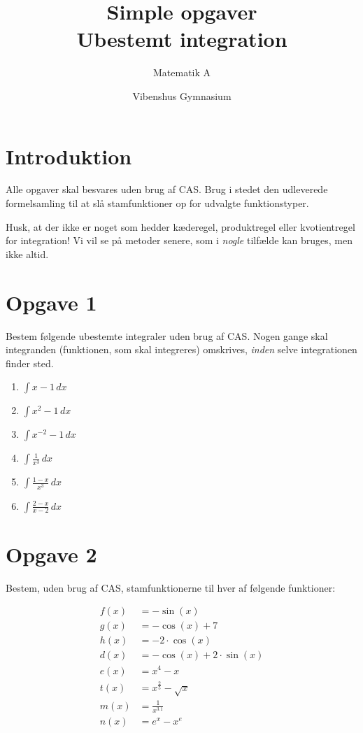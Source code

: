 \documentclass[a4paper, 12pt]{article}
\author{Matematik A}
\date{Vibenshus Gymnasium}
\title{Simple opgaver\\\medskip
\large Ubestemt integration}
\begin{document}
\maketitle

\section*{Introduktion}
\label{sec:org5ec3a09}

Alle opgaver skal besvares uden brug af CAS. Brug i stedet den udleverede formelsamling til at slå stamfunktioner op for udvalgte funktionstyper.

Husk, at der ikke er noget som hedder kæderegel, produktregel eller kvotientregel for integration! Vi vil se på metoder senere, som i \emph{nogle} tilfælde kan bruges, men ikke altid.

\section*{Opgave 1}
\label{sec:orgecebe7a}

Bestem følgende ubestemte integraler uden brug af CAS. Nogen gange skal integranden (funktionen, som skal integreres) omskrives, \emph{inden} selve integrationen finder sted.

\begin{enumerate}
\item \(\int x -1 \,dx\)
\item \(\int x^2 -1 \,dx\)
\item \(\int x^{-2} -1 \,dx\)
\item \(\int \frac{1}{x^3} \,dx\)
\item \(\int \frac{1-x}{x^3} \,dx\)
\item \(\int \frac{2-x}{x-2}\,dx\)

\newpage
\end{enumerate}
\section*{Opgave 2}
\label{sec:org149869f}
Bestem, uden brug af CAS, stamfunktionerne til hver af følgende funktioner:

\begin{align*}
f(x) &= - \sin \left( x \right) \\
g(x) &= - \cos \left( x \right) +7 \\
h(x) &= - 2 \cdot \cos \left( x \right) \\
d(x) &= - \cos \left( x \right) + 2 \cdot \sin \left( x \right)\\
e(x) &= x^4 -x \\
t(x) &= x^{\frac{2}{5}} - \sqrt{x} \\
m(x) &= \frac{1}{x^{3.1}} \\
n(x) &= e^x - x^e 
\end{align*}
\end{document}
